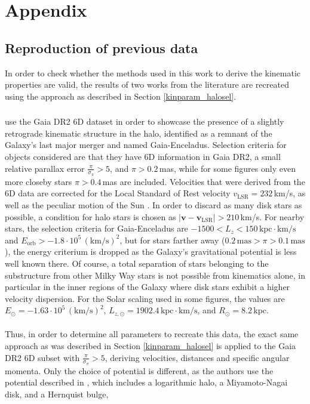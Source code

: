 \documentclass[a4paper,11pt]{article}
\begin{document}
\section{Appendix} \label{appendix}
\subsection{Reproduction of previous data}\label{kin_reprod}
In order to check whether the methods used in this work to derive the kinematic properties are valid, the results of two works from the literature \citep{helmi18,lovdal22} are recreated using the approach as described in Section \ref{kinparam_halosel}.
%
\subsubsection*{\citet{helmi18}}
\citet{helmi18} use the Gaia DR2 6D dataset in order to showcase the presence of a slightly retrograde kinematic structure in the halo, identified as a remnant of the Galaxy's last major merger and named Gaia-Enceladus. Selection criteria for objects considered are that they have 6D information in Gaia DR2, a small relative parallax error $\frac{\pi}{\sigma_\pi}>5$, and $\pi>0.2$\,mas, while for some figures only even more closeby stars $\pi>0.4$\,mas are included. Velocities that were derived from the 6D data are corrected for the Local Standard of Rest velocity $v_\mathrm{LSR}=232$\,km/s, as well as the peculiar motion of the Sun \citep[see][]{schonrich10}. In order to discard as many disk stars as possible, a condition for halo stars is chosen as $|\bm{v}-\bm{v}_\mathrm{LSR}|>210$\,km/s. For nearby stars, the selection criteria for Gaia-Enceladus are $-1500<L_z<150\,\mathrm{kpc}{\cdot}\mathrm{km/s}$ and $E_\mathrm{orb}>-1.8\cdot10^5\,\mathrm{(km/s)}^2$, but for stars farther away ($0.2\,\mathrm{mas}>\pi>0.1\,\mathrm{mas}$), the energy criterium is dropped as the Galaxy’s gravitational potential is less well known there. Of course, a total separation of stars belonging to the substructure from other Milky Way stars is not possible from kinematics alone, in particular in the inner regions of the Galaxy where disk stars exhibit a higher velocity dispersion. For the Solar scaling used in some figures, the values are $E_\odot = -1.63\cdot10^5\,\mathrm{(km/s)}^2$, $L_{z,\odot} = 1902.4\,\mathrm{kpc}{\cdot}\mathrm{km/s}$, and $R_\odot=8.2$\,kpc.\\ \\
%
Thus, in order to determine all parameters to recreate this data, the exact same approach as was described in Section \ref{kinparam_halosel} is applied to the Gaia DR2 6D subset with $\frac{\pi}{\sigma_\pi}>5$, deriving velocities, distances and specific angular momenta. Only the choice of potential is different, as the authors use the potential described in \citet{helmi17}, which includes a logarithmic halo, a Miyamoto-Nagai disk, and a Hernquist bulge,
\end{document}
